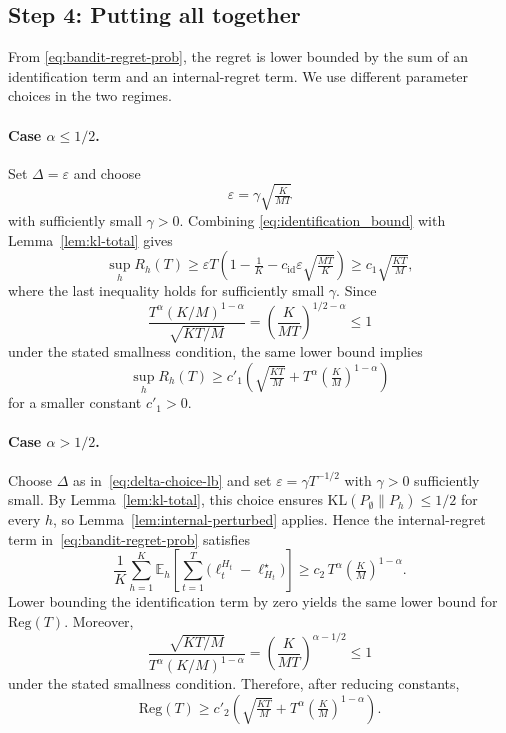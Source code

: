 \documentclass[a4paper,14pt]{extarticle}
\theoremstyle{plain}
\begin{document}
\subsection{Step 4: Putting all together}
From \eqref{eq:bandit-regret-prob}, the regret is lower bounded by the sum of an identification term and an internal-regret term. We use different parameter choices in the two regimes.

\paragraph{Case $\alpha\le 1/2$.}
Set $\Delta=\varepsilon$ and choose
\begin{equation}
\label{eq:final-eps}
\varepsilon = \gamma\sqrt{\tfrac{K}{MT}}
\end{equation}
with sufficiently small $\gamma>0$. Combining \eqref{eq:identification_bound} with Lemma~\ref{lem:kl-total} gives
\begin{equation}
\label{eq:final-ident}
\sup_h R_h(T)
\ge
\varepsilon T\left(1-\tfrac{1}{K}-c_{\mathrm{id}}\varepsilon\sqrt{\tfrac{MT}{K}}\right)
\ge c_1\sqrt{\tfrac{KT}{M}},
\end{equation}
where the last inequality holds for sufficiently small $\gamma$.
Since
\begin{equation*}
\frac{T^\alpha(K/M)^{1-\alpha}}{\sqrt{KT/M}}
=\left(\frac{K}{MT}\right)^{1/2-\alpha}\le 1
\end{equation*}
under the stated smallness condition, the same lower bound implies
\begin{equation}
\label{eq:final-ident-done}
\sup_h R_h(T)
\ge c'_1\left(\sqrt{\tfrac{KT}{M}}+T^\alpha\left(\tfrac{K}{M}\right)^{1-\alpha}\right)
\end{equation}
for a smaller constant $c'_1>0$.

\paragraph{Case $\alpha>1/2$.}
Choose $\Delta$ as in~\eqref{eq:delta-choice-lb} and set $\varepsilon=\gamma T^{-1/2}$ with $\gamma>0$ sufficiently small. By Lemma~\ref{lem:kl-total}, this choice ensures $\mathrm{KL}(P_\emptyset\|P_h)\le 1/2$ for every $h$, so Lemma~\ref{lem:internal-perturbed} applies. Hence the internal-regret term in~\eqref{eq:bandit-regret-prob} satisfies
\begin{equation}
\label{eq:final-internal-done}
\frac{1}{K}\sum_{h=1}^K
\mathbb E_h\!\left[\sum_{t=1}^T \bigl(\ell_t^{H_t} - \ell_{H_t}^\star\bigr)\right]
\ge c_2\,T^\alpha\!\left(\tfrac{K}{M}\right)^{1-\alpha}.
\end{equation}
Lower bounding the identification term by zero yields the same lower bound for $\mathrm{Reg}(T)$. Moreover,
\begin{equation*}
\frac{\sqrt{KT/M}}{T^\alpha(K/M)^{1-\alpha}}
=\left(\frac{K}{MT}\right)^{\alpha-1/2}\le 1
\end{equation*}
under the stated smallness condition. Therefore, after reducing constants,
\begin{equation}
\label{eq:final-lb}
\mathrm{Reg}(T)
\ge c'_2\left(\sqrt{\tfrac{KT}{M}}+T^\alpha\left(\tfrac{K}{M}\right)^{1-\alpha}\right).
\end{equation}
\end{document}

